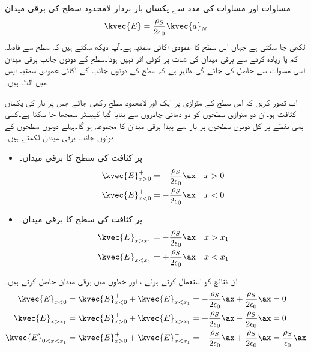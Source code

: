 مساوات  اور مساوات  کی مدد سے یکساں بار بردار لامحدود سطح کی برقی میدان
\begin{align}\label{مساوات_کولمب_لامحدود_سطح_کی_برقی-میدان}
\kvec{E}=\frac{\rho_S}{2 \epsilon_0}\kvec{a}_N
\end{align}
لکھی جا سکتی ہے جہاں  اس سطح کا عمودی اکائی سمتیہ ہے۔آپ دیکھ سکتے ہیں کہ سطح سے فاصلہ کم یا زیادہ کرنے سے برقی میدان کی شدت پر کوئی اثر نہیں ہوتا۔سطح کے دونوں جانب برقی میدان اسی مساوات سے حاصل کی جائے گی۔ظاہر ہے کہ سطح کے دونوں جانب کے اکائی عمودی سمتیہ آپس میں الٹ ہیں۔

اب تصور کریں کہ اس سطح کے متوازی  پر  ایک اور لامحدود سطح  رکھی جائے جس پر بار کی یکساں کثافت  ہو۔ان دو متوازی سطحوں کو دو دھاتی چادروں سے بنایا گیا کپیسٹر سمجھا جا سکتا ہے۔کسی بھی نقطے پر کل  دونوں سطحوں پر بار سے پیدا برقی میدان کا مجموعہ ہو گا۔پہلے دونوں سطحوں کے دونوں جانب برقی میدان لکھتے ہیں۔ 
\begin{itemize}
\item
{} پر  کثافت کی سطح کا برقی میدان۔
\begin{align*}
\kvec{E}_{x>0}^{+}&=+\frac{\rho_S}{2\epsilon_0} \ax &x>0\\
\kvec{E}_{x<0}^{+}&=-\frac{\rho_S}{2\epsilon_0} \ax &x<0
\end{align*} 
\item
{} پر  کثافت کی سطح کا برقی میدان۔
\begin{align*}
\kvec{E}_{x>x_1}^{-}&=-\frac{\rho_S}{2\epsilon_0} \ax &x>x_1\\
\kvec{E}_{x<x_1}^{-}&=+\frac{\rho_S}{2\epsilon_0} \ax &x<x_1
\end{align*} 

\end{itemize}
ان نتائج کو استعمال کرتے ہوئے ، اور  خطوں میں برقی میدان حاصل کرتے ہیں۔
\begin{gather}
\begin{aligned}
\kvec{E}_{x<0}&=\kvec{E}_{x<0}^{+} +\kvec{E}_{x<x_1}^-=-\frac{\rho_S}{2\epsilon_0} \ax+\frac{\rho_S}{2\epsilon_0} \ax =0\\
\kvec{E}_{x>x_1}&=\kvec{E}_{x>0}^{+} +\kvec{E}_{x>x_1}^{-}=+\frac{\rho_S}{2\epsilon_0} \ax-\frac{\rho_S}{2\epsilon_0} \ax=0\\
\kvec{E}_{0<x<x_1}&=\kvec{E}_{x>0}^{+}+\kvec{E}_{x<x_1}^{-}=+\frac{\rho_S}{2\epsilon_0} \ax+\frac{\rho_S}{2\epsilon_0} \ax =\frac{\rho_S}{\epsilon_0} \ax
\end{aligned}
\end{gather}

